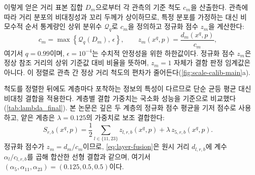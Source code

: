 이렇게 얻은 거리 표본 집합 $D_m$으로부터 각 관측의 기준 척도 $c_m$을 산출한다.
관측에 따라 거리 분포의 비대칭성과 꼬리 두께가 상이하므로, 특정 분포를 가정하는 대신 비모수적 순서 통계량인 상위 분위수 $\mathcal{Q}_q$로 $c_m$을 정의하고 정규화 점수 $z_m$을 계산한다:
\begin{equation}
  c_m = \max \left\{ \mathcal{Q}_q(D_m), \, \epsilon \right\}, \qquad z_m(x^q, p) = \frac{d_m(x^q, p)}{c_m},
  \label{eq:scale-cm}
\end{equation}
여기서 $q=0.99$이며, $\epsilon=10^{-4}$는 수치적 안정성을 위한 하한값이다.
정규화 점수 $z_m$은 정상 참조 거리의 상위 기준값 대비 비율을 뜻하며, $z_m=1$ 자체가 결함 판정 임계값은 아니다.
이 정렬로 관측 간 정상 거리 척도의 편차가 줄어든다(\cref{fig:scale-calib-main}a).

척도를 정렬한 뒤에도 계층마다 포착하는 정보의 특성이 다르므로 단순 균등 평균 대신 비대칭 결합을 적용한다.
계층별 결합 가중치는 국소화 성능을 기준으로 비교했다(\cref{tab:lambda_final}). 본 논문은 깊은 두 계층의 정규화 점수 평균을 기저 점수로 사용하고, 얕은 계층은 $\lambda=0.125$의 가중치로 보조 결합한다:
\begin{equation}
  S_{r,b}(x^q, p) = \frac{1}{2} \sum_{l \in \{11, 23\}} z_{l,r,b}(x^q, p) + \lambda \, z_{5,r,b}(x^q, p).
  \label{eq:layer-fusion}
\end{equation}
정규화 점수가 $z_m = d_m/c_m$이므로, \cref{eq:layer-fusion}은 원시 거리 $d_{l,r,b}$에 계수 $\alpha_l / c_{l,r,b}$를 곱해 합산한 선형 결합과 같으며, 여기서 $(\alpha_5, \alpha_{11}, \alpha_{23}) = (0.125, 0.5, 0.5)$이다.

